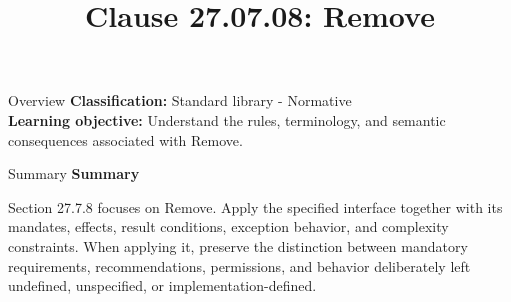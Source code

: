 \documentclass[10pt,letterpaper]{article}
\title{Clause 27.07.08: Remove}
\author{}
\date{}
\begin{document}
\maketitle
\begin{CornellOverviewBox}{Overview}
\textbf{Classification:} Standard library - Normative\\[2pt]
\textbf{Learning objective:} Understand the rules, terminology, and semantic consequences associated with Remove.
\end{CornellOverviewBox}\begin{CornellSummaryBox}{Summary}
{\sffamily\bfseries\color{Accent} Summary}\par\vspace{3pt}Section 27.7.8 focuses on Remove. Apply the specified interface together with its mandates, effects, result conditions, exception behavior, and complexity constraints. When applying it, preserve the distinction between mandatory requirements, recommendations, permissions, and behavior deliberately left undefined, unspecified, or implementation-defined.
\end{CornellSummaryBox}
\end{document}
